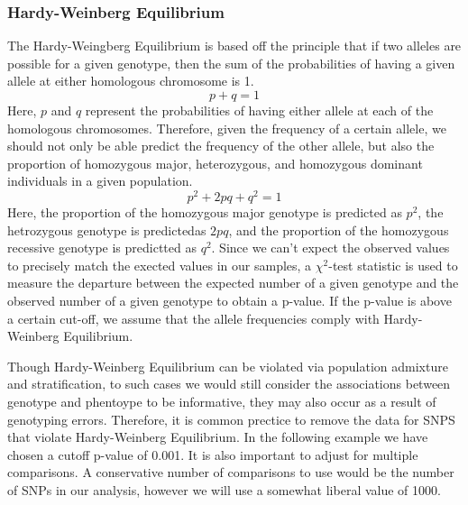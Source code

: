 \documentclass[11pt]{article}\usepackage[]{graphicx}\usepackage[]{color}
\begin{document}
\subsubsection*{Hardy-Weinberg Equilibrium}
The Hardy-Weingberg Equilibrium is based off the principle that if two alleles are possible for a given genotype, then the sum of the probabilities of having a given allele at either homologous chromosome is 1.
$$p+q=1$$
Here, $p$ and $q$ represent the probabilities of having either allele at each of the homologous chromosomes.
Therefore, given the frequency of a certain allele, we should not only be able predict the frequency of the other allele, but also the proportion of homozygous major, heterozygous, and homozygous dominant individuals in a given population.
$$p^2 +2pq+q^2=1$$
Here, the proportion of the homozygous major genotype is predicted as $p^2$, the hetrozygous genotype is predictedas $2pq$, and the proportion of the homozygous recessive genotype  is predictted as $q^2$. Since we can't expect the observed values to precisely match the exected values in our samples, a $\chi^2$-test statistic is used to measure the departure between the expected number of a given genotype and the observed number of a given genotype to obtain a p-value.  If the p-value is above a certain cut-off, we assume that the allele frequencies comply with Hardy-Weinberg Equilibrium. 

Though Hardy-Weinberg Equilibrium can be violated via population admixture and stratification, to such cases we would still consider the associations between genotype and phentoype to be informative, they may also occur as a result of genotyping errors.  Therefore, it is common prectice to remove the data for SNPS that violate Hardy-Weinberg Equilibrium. In the following example we have chosen a cutoff p-value of 0.001.
It is also important to adjust for multiple comparisons. A conservative number of comparisons to use would be the number of SNPs in our analysis, however we will use a somewhat liberal value of 1000.
\end{document}
